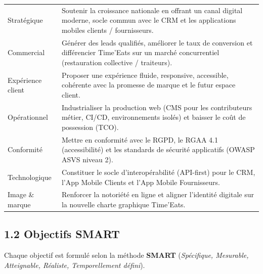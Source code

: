 \documentclass[11pt,a4paper,oneside]{report}
\begin{document}
\renewcommand{\arraystretch}{1.35}
\begin{tabularx}{\textwidth}{L{3.5cm} Y}
\toprule
{} &  \\
\midrule
Stratégique          & Soutenir la croissance nationale en offrant un canal digital
moderne, socle commun avec le CRM et les applications mobiles clients / fournisseurs. \\
Commercial           & Générer des leads qualifiés, améliorer le taux de conversion et
différencier Time'Eats sur un marché concurrentiel (restauration collective / traiteurs). \\
Expérience client    & Proposer une expérience fluide, responsive, accessible, cohérente
avec la promesse de marque et le futur espace client. \\
Opérationnel         & Industrialiser la production web (CMS pour les contributeurs métier,
CI/CD, environnements isolés) et baisser le coût de possession (TCO). \\
Conformité           & Mettre en conformité avec le RGPD, le RGAA 4.1 (accessibilité) et les
standards de sécurité applicatifs (OWASP ASVS niveau 2). \\
Technologique        & Constituer le socle d'interopérabilité (API-first) pour le CRM, l'App
Mobile Clients et l'App Mobile Fournisseurs. \\
Image \& marque      & Renforcer la notoriété en ligne et aligner l'identité digitale sur la
nouvelle charte graphique Time'Eats. \\
\bottomrule
\end{tabularx}

\subsection*{1.2 Objectifs SMART}

Chaque objectif est formulé selon la méthode \textbf{SMART} (\textit{Spécifique,
Mesurable, Atteignable, Réaliste, Temporellement défini}).
\end{document}
